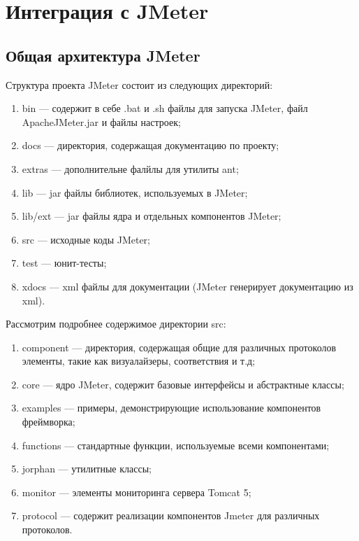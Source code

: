 \section{Интеграция с JMeter}

\subsection{Общая архитектура JMeter}

Структура проекта JMeter состоит из следующих директорий:

\begin{enumerate}
\item bin --- содержит в себе .bat и .sh файлы для запуска JMeter, файл ApacheJMeter.jar и файлы настроек;
\item docs --- директория, содержащая документацию по проекту;
\item extras --- дополнительне фалйлы для утилиты ant;
\item lib --- jar файлы библиотек, используемых в JMeter;
\item lib/ext --- jar файлы ядра и отдельных компонентов JMeter;
\item src --- исходные коды JMeter;
\item test --- юнит-тесты;
\item xdocs --- xml файлы для документации (JMeter генерирует документацию из xml).
\end{enumerate}

Рассмотрим подробнее содержимое директории src:

\begin{enumerate}
\item component --- директория, содержащая общие для различных протоколов элементы, такие как визуалайзеры,
соответствия и т.д;
\item core --- ядро JMeter, содержит базовые интерфейсы и абстрактные классы;
\item examples --- примеры, демонстрирующие использование компонентов фреймворка;
\item functions --- стандартные функции, используемые всеми компонентами;
\item jorphan --- утилитные классы;
\item monitor --- элементы мониторинга сервера Tomcat 5;
\item protocol --- содержит реализации компонентов Jmeter для различных протоколов.
\end{enumerate}

